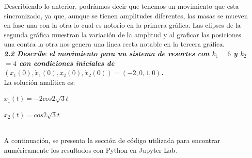 \documentclass[12pt]{article}
\begin{document}
Describiendo lo anterior, podríamos decir que tenemos un movimiento que esta sincronizado, ya que, aunque se tienen amplitudes diferentes, las masas se mueven en fase una con la otra lo cual es notorio en la primera gráfica. Las elipses de la segunda gráfica muestran la variación de la amplitud y al graficar las posiciones una contra la otra nos genera una línea recta notable en la tercera gráfica.\\

\textbf{\textit{2.2 Describe el movimiento para un sistema de resortes con $k_1$$=6$ y $k_2$$=4$ con condiciones iniciales de $(x_1(0), \dot x_1(0), x_2(0), \dot x_2(0))=(-2,0,1,0)$.}}\\

La solución analítica es:\\
\centerline{$x_1(t)=-2cos2\sqrt3t$}
\centerline{$x_2(t)=cos2\sqrt3t$}\\

A continuación, se presenta la sección de código utilizada para encontrar numéricamente los resultados con Python en Jupyter Lab.
\end{document}
